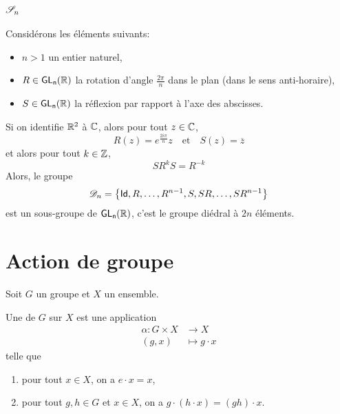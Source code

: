 \subsection*{\(\mathscr{S}_n\)}\label{subsec:sn}

Considérons les éléments suivants:
\begin{itemize}
    \item \(n > 1\) un entier naturel,
    \item \(R \in \operatorname{\mathsf{GL_{n}}}(\mathbb{R})\) la rotation d'angle \(\frac{2\pi}{n}\)
    dans le plan (dans le sens anti-horaire),
    \item \(S \in \operatorname{\mathsf{GL_{n}}}(\mathbb{R})\) la réflexion par rapport à l'axe des abscisses.
\end{itemize}

Si on identifie \(\mathbb{R}^2\) à \(\mathbb{C}\), alors pour tout \(z \in \mathbb{C}\),
    \begin{equation*}
        R(z) = e^{\frac{2i\pi}{n}}z \quad\text{et}\quad S(z) = \overline{z}
    \end{equation*}
    et alors pour tout \(k \in \mathbb{Z}\),
    \begin{equation*}
        S R^k S = R^{-k}
    \end{equation*}
    Alors, le groupe
    \begin{equation*}
        \mathscr{D}_n = \left\{ \operatorname{\mathsf{Id}}, R, \ldots, R^{n-1}, S, SR, \ldots, SR^{n-1} \right\}
    \end{equation*}
    est un sous-groupe de \(\operatorname{\mathsf{GL_{n}}}(\mathbb{R})\), c'est le groupe diédral à \(2n\) éléments.


\section{Action de groupe}\label{sec:action-de-groupe}

Soit \(G\) un groupe et \(X\) un ensemble.

\begin{definition}
    Une  de \(G\) sur \(X\) est une application
    \begin{equation*}
        \begin{aligned}
            \alpha : G \times X &\to X\\
            (g,x) &\mapsto g \cdot x
        \end{aligned}
    \end{equation*}
    telle que
    \begin{enumerate}[label=(\roman*)] %
        \item pour tout \(x \in X\), on a \(e \cdot x = x\),
        \item pour tout \(g,h \in G\) et \(x \in X\), on a \(g \cdot (h \cdot x) = (gh) \cdot x\).
    \end{enumerate}
\end{definition}

